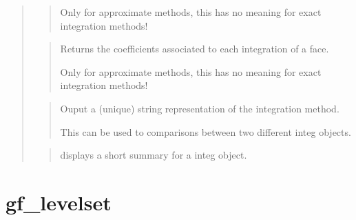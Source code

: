 \documentclass[a4paper,11pt,english]{sphinxmanual}
\begin{document}
\begin{quote}
\begin{quote}
Only for approximate methods, this has no meaning for exact
integration methods!
\end{quote}

\begin{quote}

Returns the coefficients associated to each integration of a face.

Only for approximate methods, this has no meaning for exact
integration methods!
\end{quote}

\begin{quote}

Ouput a (unique) string representation of the integration method.

This can be used to  comparisons between two different integ
objects.
\end{quote}

\begin{quote}

displays a short summary for a integ object.
\end{quote}
\end{quote}


\section{gf\_levelset}
\label{\detokenize{matlab_octave/cmdref_gf_levelset:gf-levelset}}\label{\detokenize{matlab_octave/cmdref_gf_levelset::doc}}

\begin{sphinxVerbatim}[commandchars=\\\{\}]
     \PYG{p}{[}    \PYG{p}{[}     \PYG{p}{]}\PYG{p}{]}
\end{sphinxVerbatim}

\end{document}
